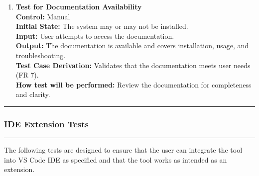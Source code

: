 \documentclass[12pt, titlepage]{article}
\newcommand{\colorrule}{\textcolor{BlueViolet}{\rule{\linewidth}{2pt}}}
\begin{document}
\begin{enumerate}[label={\bf
    \textcolor{Maroon}{test-FR-DA-\arabic*}}, wide=0pt, font=\itshape]
  \item \textbf{Test for Documentation Availability}\\[2mm]
    \textbf{Control:} Manual\\
    \textbf{Initial State:} The system may or may not be installed.\\
    \textbf{Input:} User attempts to access the documentation.\\
    \textbf{Output:} The documentation is available and covers
    installation, usage, and troubleshooting.\\[2mm]
    \textbf{Test Case Derivation:} Validates that the documentation
    meets user needs (FR 7).\\[2mm]
    \textbf{How test will be performed:} Review the documentation for
    completeness and clarity.
\end{enumerate}

\noindent
\colorrule

\subsubsection{IDE Extension Tests}
\colorrule

\medskip

\noindent
The following tests are designed to ensure that the user can
integrate the tool into VS Code IDE as specified and that
the tool works as intended as an extension.
\end{document}
